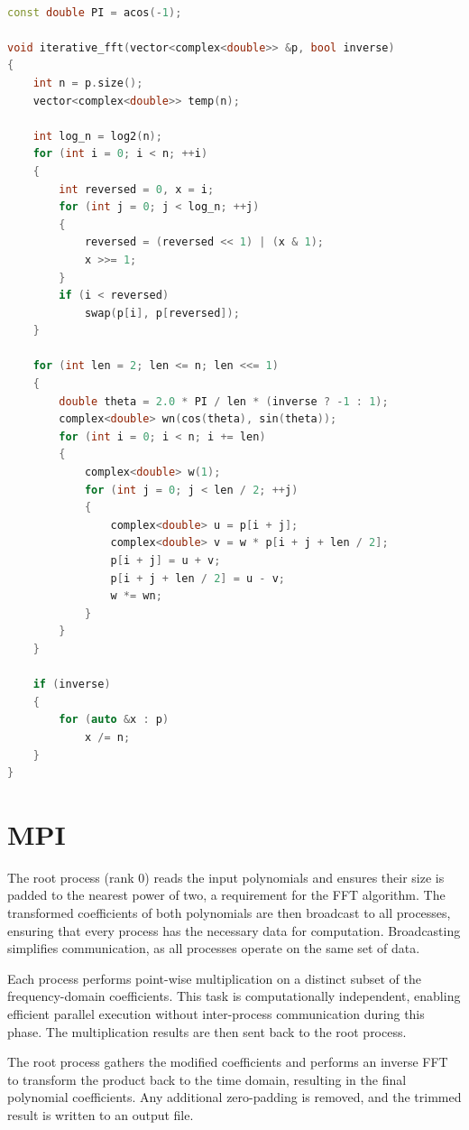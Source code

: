 \documentclass[12pt]{article}
\theoremstyle{definition}
\begin{document}
\begin{lstlisting}[language=C++, caption={Iterative implementation of FFT.}]

const double PI = acos(-1);

void iterative_fft(vector<complex<double>> &p, bool inverse)
{
    int n = p.size();
    vector<complex<double>> temp(n);

    int log_n = log2(n);
    for (int i = 0; i < n; ++i)
    {
        int reversed = 0, x = i;
        for (int j = 0; j < log_n; ++j)
        {
            reversed = (reversed << 1) | (x & 1);
            x >>= 1;
        }
        if (i < reversed)
            swap(p[i], p[reversed]);
    }

    for (int len = 2; len <= n; len <<= 1)
    {
        double theta = 2.0 * PI / len * (inverse ? -1 : 1);
        complex<double> wn(cos(theta), sin(theta));
        for (int i = 0; i < n; i += len)
        {
            complex<double> w(1);
            for (int j = 0; j < len / 2; ++j)
            {
                complex<double> u = p[i + j];
                complex<double> v = w * p[i + j + len / 2];
                p[i + j] = u + v;
                p[i + j + len / 2] = u - v;
                w *= wn;
            }
        }
    }

    if (inverse)
    {
        for (auto &x : p)
            x /= n;
    }
}
\end{lstlisting}

\section{MPI}
    
The root process (rank 0) reads the input polynomials and ensures their size is padded to the nearest power of two, a requirement for the FFT algorithm. The transformed coefficients of both polynomials are then broadcast to all processes, ensuring that every process has the necessary data for computation. Broadcasting simplifies communication, as all processes operate on the same set of data.

Each process performs point-wise multiplication on a distinct subset of the frequency-domain coefficients. This task is computationally independent, enabling efficient parallel execution without inter-process communication during this phase. The multiplication results are then sent back to the root process.

The root process gathers the modified coefficients and performs an inverse FFT to transform the product back to the time domain, resulting in the final polynomial coefficients. Any additional zero-padding is removed, and the trimmed result is written to an output file.
\end{document}

